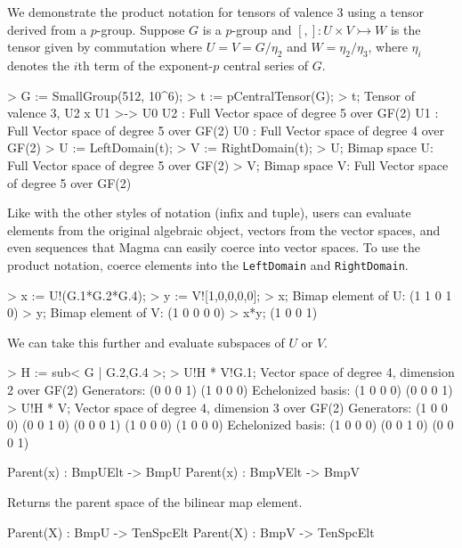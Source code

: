 \begin{example}[BimapProduct]

We demonstrate the product notation for tensors of valence 3 using a tensor derived from a $p$-group. 
Suppose $G$ is a $p$-group and $[,] : U\times V\rightarrowtail W$ is the tensor given by commutation where $U=V=G/\eta_2$ and $W=\eta_2/\eta_3$, where $\eta_i$ denotes the $i$th term of the exponent-$p$ central series of $G$.
\begin{code}
> G := SmallGroup(512, 10^6);
> t := pCentralTensor(G);
> t;
Tensor of valence 3, U2 x U1 >-> U0
U2 : Full Vector space of degree 5 over GF(2)
U1 : Full Vector space of degree 5 over GF(2)
U0 : Full Vector space of degree 4 over GF(2)
> U := LeftDomain(t);
> V := RightDomain(t);
> U;
Bimap space U: Full Vector space of degree 5 over GF(2)
> V;
Bimap space V: Full Vector space of degree 5 over GF(2)
\end{code}

Like with the other styles of notation (infix and tuple), users can evaluate elements from the original algebraic object, vectors from the vector spaces, and even sequences that Magma can easily coerce into vector spaces. 
To use the product notation, coerce elements into the \texttt{LeftDomain} and \texttt{RightDomain}.

\begin{code}
> x := U!(G.1*G.2*G.4);
> y := V![1,0,0,0,0];
> x;
Bimap element of U: (1 1 0 1 0)
> y;
Bimap element of V: (1 0 0 0 0)
> x*y;
(1 0 0 1)
\end{code}

We can take this further and evaluate subspaces of $U$ or $V$.
\begin{code}
> H := sub< G | G.2,G.4 >;
> U!H * V!G.1;
Vector space of degree 4, dimension 2 over GF(2)
Generators:
(0 0 0 1)
(1 0 0 0)
Echelonized basis:
(1 0 0 0)
(0 0 0 1)
> U!H * V;
Vector space of degree 4, dimension 3 over GF(2)
Generators:
(1 0 0 0)
(0 0 1 0)
(0 0 0 1)
(1 0 0 0)
(1 0 0 0)
Echelonized basis:
(1 0 0 0)
(0 0 1 0)
(0 0 0 1)
\end{code}
\end{example}


\begin{intrinsics}
Parent(x) : BmpUElt -> BmpU
Parent(x) : BmpVElt -> BmpV
\end{intrinsics}

Returns the parent space of the bilinear map element.

\begin{intrinsics}
Parent(X) : BmpU -> TenSpcElt
Parent(X) : BmpV -> TenSpcElt
\end{intrinsics}


